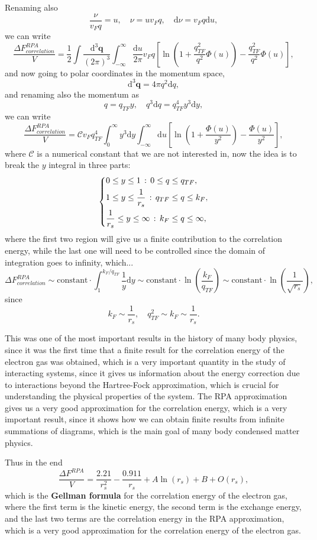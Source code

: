 Renaming also
\[
    \frac{\nu}{v_F q} = u, \quad \nu = u v_F q, \quad \mathrm{d}\nu = v_F q \mathrm{d}u,
\]
we can write
\[
    \frac{\Delta F^{RPA}_{correlation}}{V} = \frac{1}{2} \int \frac{\mathrm{d}^3 \mathbf{q}}{(2\pi)^3} \int_{-\infty}^{\infty} \frac{\mathrm{d}u}{2\pi} v_F q \left[ \ln (1 + \frac{q_{TF}^2}{q^2} \Phi(u)) - \frac{q_{TF}^2}{q^2} \Phi(u) \right],
\]
and now going to polar coordinates in the momentum space,
\[
    \mathrm{d}^3 \mathbf{q} = 4 \pi q^2 \mathrm{d}q,
\]
and renaming also the momentum as
\[
    q = q_{TF} y, \quad q^3 \mathrm{d}q = q^4_{TF} y^3 \mathrm{d}y,
\]
we can write
\[
    \frac{\Delta F^{RPA}_{correlation}}{V} = \mathcal{C} v_F q_{TF}^4 \int_0^{\infty} y^3 \mathrm{d}y \int_{-\infty}^{\infty} \mathrm{d}u \left[ \ln (1 + \frac{\Phi(u)}{y^2}) - \frac{\Phi(u)}{y^2} \right],
\]
where \(\mathcal{C}\) is a numerical constant that we are not interested in, now the idea is to break the \(y\) integral in three parts:
\[
    \begin{dcases}
        0 \leq y \leq 1 \, : \, 0 \leq q \leq q_{TF},               \\
        1 \leq y \leq \frac{1}{r_s} \, : \, q_{TF} \leq q \leq k_F, \\
        \frac{1}{r_s} \leq y \leq \infty \, : \, k_F \leq q \leq \infty,
    \end{dcases}
\]
where the first two region will give us a finite contribution to the correlation energy, while the last one will need to be controlled since the domain of integration goes to infinity, which...
\[
    \Delta F^{RPA}_{correlation} \sim \text{constant} \cdot \int_1^{k_F / q_{TF}} \frac{1}{y} \mathrm{d}y \sim \text{constant} \cdot \ln \left( \frac{k_F}{q_{TF}} \right) \sim \text{constant} \cdot \ln (\frac{1}{\sqrt{r_s}}),
\]
since
\[
    k_F \sim \frac{1}{r_s}, \quad q_{TF}^2 \sim k_F \sim \frac{1}{r_s}.
\]

This was one of the most important results in the history of many body physics, since it was the first time that a finite result for the correlation energy of the electron gas was obtained, which is a very important quantity in the study of interacting systems, since it gives us information about the energy correction due to interactions beyond the Hartree-Fock approximation, which is crucial for understanding the physical properties of the system. The RPA approximation gives us a very good approximation for the correlation energy, which is a very important result, since it shows how we can obtain finite results from infinite summations of diagrams, which is the main goal of many body condensed matter physics.

Thus in the end
\[
    \frac{\Delta F^{RPA}}{V} = \frac{2.21}{r_s^2} - \frac{0.911}{r_s} + A \ln (r_s) + B + O(r_s),
\]
which is the \textbf{Gellman formula} for the correlation energy of the electron gas, where the first term is the kinetic energy, the second term is the exchange energy, and the last two terms are the correlation energy in the RPA approximation, which is a very good approximation for the correlation energy of the electron gas.

